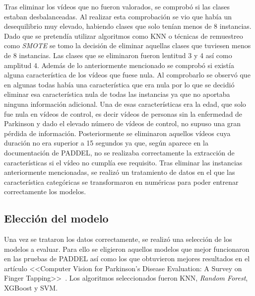 Tras eliminar los vídeos que no fueron valorados, se comprobó si las clases estaban desbalanceadas. Al realizar esta comprobación se vio que había un desequilibrio muy elevado, habiendo clases que solo tenían menos de 8 instancias. Dado que se pretendía utilizar algoritmos como KNN o técnicas de remuestreo como \textit{SMOTE} se tomo la decisión de eliminar aquellas clases que tuviesen menos de 8 instancias. Las clases que se eliminaron fueron lentitud 3 y 4 así como amplitud 4.
Además de lo anteriormente mencionado se comprobó si existía alguna característica de los vídeos que fuese nula. Al comprobarlo se observó que en algunas todas había una característica que era nula por lo que se decidió eliminar esa característica nula de todas las instancias ya que no aportaba ninguna información adicional. Una de esas características era la edad, que solo fue nula en vídeos de control, es decir vídeos de personas sin la enfermedad de Parkinson y dado el elevado número de vídeos de control, no supuso una gran pérdida de información. Posteriormente se eliminaron aquellos vídeos cuya duración no era superior a 15 segundos ya que, según aparece en la documentación de PADDEL, no se realizaba correctamente la extracción de características si el vídeo no cumplía ese requisito.
Tras eliminar las instancias anteriormente mencionadas, se realizó un tratamiento de datos en el que las característica categóricas se transformaron en numéricas para poder entrenar correctamente los modelos.

\subsection{Elección del modelo}

Una vez se trataron los datos correctamente, se realizó una selección de los modelos a evaluar. Para ello se eligieron aquellos modelos que mejor funcionaron en las pruebas de PADDEL así como los que obtuvieron mejores resultados en el artículo <<Computer Vision for Parkinson’s Disease Evaluation: A Survey on Finger Tapping>>~\cite{AmoSalas2024}. Los algoritmos seleccionados fueron KNN, \textit{Random Forest}, XGBoost y SVM.


